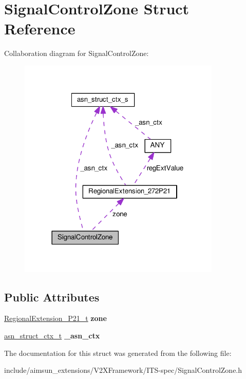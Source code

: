 \hypertarget{structSignalControlZone}{}\section{Signal\+Control\+Zone Struct Reference}
\label{structSignalControlZone}


Collaboration diagram for Signal\+Control\+Zone\+:\nopagebreak
\begin{figure}[H]
\begin{center}
\leavevmode
\includegraphics[width=273pt]{structSignalControlZone__coll__graph}
\end{center}
\end{figure}
\subsection*{Public Attributes}
\begin{DoxyCompactItemize}
\item 
\hyperlink{structRegionalExtension__272P21}{Regional\+Extension\+\_\+P21\+\_\+t} {\bfseries zone}\hypertarget{structSignalControlZone_aa4ff431d3cc6462e48a7286544a013a8}{}\label{structSignalControlZone_aa4ff431d3cc6462e48a7286544a013a8}

\item 
\hyperlink{structasn__struct__ctx__s}{asn\+\_\+struct\+\_\+ctx\+\_\+t} {\bfseries \+\_\+asn\+\_\+ctx}\hypertarget{structSignalControlZone_a267dd4f565d13b79928920790032de6f}{}\label{structSignalControlZone_a267dd4f565d13b79928920790032de6f}

\end{DoxyCompactItemize}


The documentation for this struct was generated from the following file\+:\begin{DoxyCompactItemize}
\item 
include/aimsun\+\_\+extensions/\+V2\+X\+Framework/\+I\+T\+S-\/spec/Signal\+Control\+Zone.\+h\end{DoxyCompactItemize}
